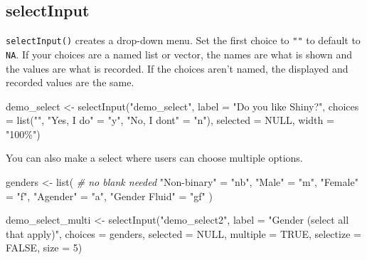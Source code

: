 \documentclass[
]{book}
\newenvironment{Shaded}{\begin{snugshade}}{\end{snugshade}}
\newcommand{\AttributeTok}[1]{\textcolor[rgb]{0.77,0.63,0.00}{#1}}
\newcommand{\CommentTok}[1]{\textcolor[rgb]{0.56,0.35,0.01}{\textit{#1}}}
\newcommand{\ConstantTok}[1]{\textcolor[rgb]{0.00,0.00,0.00}{#1}}
\newcommand{\DecValTok}[1]{\textcolor[rgb]{0.00,0.00,0.81}{#1}}
\newcommand{\FunctionTok}[1]{\textcolor[rgb]{0.00,0.00,0.00}{#1}}
\newcommand{\NormalTok}[1]{#1}
\newcommand{\OtherTok}[1]{\textcolor[rgb]{0.56,0.35,0.01}{#1}}
\newcommand{\StringTok}[1]{\textcolor[rgb]{0.31,0.60,0.02}{#1}}
\begin{document}
\hypertarget{selectinput}{%
\subsection{selectInput}\label{selectinput}}

\texttt{selectInput()} creates a drop-down menu. Set the first choice to \texttt{""} to default to \texttt{NA}. If your choices are a named list or vector, the names are what is shown and the values are what is recorded. If the choices aren't named, the displayed and recorded values are the same.

\begin{Shaded}
\begin{Highlighting}[]
\NormalTok{demo\_select }\OtherTok{\textless{}{-}} 
  \FunctionTok{selectInput}\NormalTok{(}\StringTok{"demo\_select"}\NormalTok{, }
              \AttributeTok{label =} \StringTok{"Do you like Shiny?"}\NormalTok{, }
              \AttributeTok{choices =} \FunctionTok{list}\NormalTok{(}\StringTok{""}\NormalTok{, }
                             \StringTok{"Yes, I do"} \OtherTok{=} \StringTok{"y"}\NormalTok{, }
                             \StringTok{"No, I don\textquotesingle{}t"} \OtherTok{=} \StringTok{"n"}\NormalTok{),}
              \AttributeTok{selected =} \ConstantTok{NULL}\NormalTok{,}
              \AttributeTok{width =} \StringTok{"100\%"}\NormalTok{)}
\end{Highlighting}
\end{Shaded}

You can also make a select where users can choose multiple options.

\begin{Shaded}
\begin{Highlighting}[]
\NormalTok{genders }\OtherTok{\textless{}{-}} \FunctionTok{list}\NormalTok{( }\CommentTok{\# no blank needed}
  \StringTok{"Non{-}binary"} \OtherTok{=} \StringTok{"nb"}\NormalTok{,}
  \StringTok{"Male"} \OtherTok{=} \StringTok{"m"}\NormalTok{,}
  \StringTok{"Female"} \OtherTok{=} \StringTok{"f"}\NormalTok{,}
  \StringTok{"Agender"} \OtherTok{=} \StringTok{"a"}\NormalTok{,}
  \StringTok{"Gender Fluid"} \OtherTok{=} \StringTok{"gf"}
\NormalTok{)}

\NormalTok{demo\_select\_multi }\OtherTok{\textless{}{-}} 
  \FunctionTok{selectInput}\NormalTok{(}\StringTok{"demo\_select2"}\NormalTok{, }
              \AttributeTok{label =} \StringTok{"Gender (select all that apply)"}\NormalTok{, }
              \AttributeTok{choices =}\NormalTok{ genders,}
              \AttributeTok{selected =} \ConstantTok{NULL}\NormalTok{,}
              \AttributeTok{multiple =} \ConstantTok{TRUE}\NormalTok{, }
              \AttributeTok{selectize =} \ConstantTok{FALSE}\NormalTok{,}
              \AttributeTok{size =} \DecValTok{5}\NormalTok{)}
\end{Highlighting}
\end{Shaded}
\end{document}
